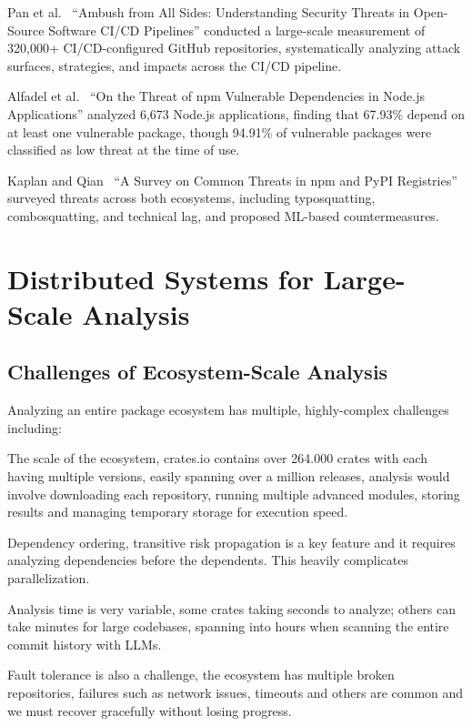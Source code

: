 Pan et al.~\cite{pan2024ambush} ``Ambush from All Sides: Understanding Security Threats in Open-Source Software CI/CD Pipelines'' conducted a large-scale measurement of 320,000+ CI/CD-configured GitHub repositories, systematically analyzing attack surfaces, strategies, and impacts across the CI/CD pipeline.

Alfadel et al.~\cite{alfadel2021npm} ``On the Threat of npm Vulnerable Dependencies in Node.js Applications'' analyzed 6,673 Node.js applications, finding that 67.93\% depend on at least one vulnerable package, though 94.91\% of vulnerable packages were classified as low threat at the time of use.

Kaplan and Qian~\cite{kaplan2021survey} ``A Survey on Common Threats in npm and PyPI Registries'' surveyed threats across both ecosystems, including typosquatting, combosquatting, and technical lag, and proposed ML-based countermeasures.

\section{Distributed Systems for Large-Scale Analysis}\label{sect:distributed-systems}

\subsection{Challenges of Ecosystem-Scale Analysis}\label{sect:challenges-ecosystem-scale-analysis}

Analyzing an entire package ecosystem has multiple, highly-complex challenges including:

The scale of the ecosystem, crates.io contains over 264.000 crates with each having multiple versions, easily spanning over a million releases, analysis would involve downloading each repository, running multiple advanced modules, storing results and managing temporary storage for execution speed.

Dependency ordering, transitive risk propagation is a key feature and it requires analyzing dependencies before the dependents. This heavily complicates parallelization.

Analysis time is very variable, some crates taking seconds to analyze; others can take minutes for large codebases, spanning into hours when scanning the entire commit history with LLMs.

Fault tolerance is also a challenge, the ecosystem has multiple broken repositories, failures such as network issues, timeouts and others are common and we must recover gracefully without losing progress.

